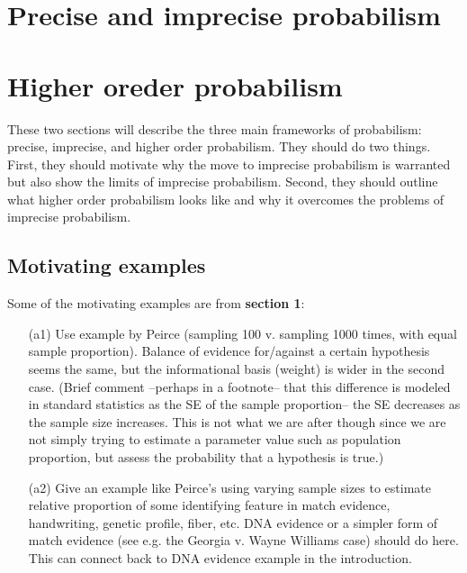 \documentclass[
  10pt,
  dvipsnames,enabledeprecatedfontcommands]{scrartcl}
\begin{document}
\hypertarget{precise-and-imprecise-probabilism}{%
\section{Precise and imprecise
probabilism}\label{precise-and-imprecise-probabilism}}

\hypertarget{higher-oreder-probabilism}{%
\section{Higher oreder probabilism}\label{higher-oreder-probabilism}}

These two sections will describe the three main frameworks of
probabilism: precise, imprecise, and higher order probabilism. They
should do two things. First, they should motivate why the move to
imprecise probabilism is warranted but also show the limits of imprecise
probabilism. Second, they should outline what higher order probabilism
looks like and why it overcomes the problems of imprecise probabilism.

\hypertarget{motivating-examples}{%
\subsection{Motivating examples}\label{motivating-examples}}

Some of the motivating examples are from \textbf{section 1}:

\begin{itemize}

\item[(a1)] Use example by Peirce (sampling 100 v. sampling 1000 times, with equal sample proportion). Balance of evidence for/against a certain hypothesis seems the same, but the informational basis (weight) is wider in the second case.
(Brief comment --perhaps in a footnote-- that this difference is modeled in standard statistics as the SE of the sample proportion-- the SE decreases as the sample size increases. This is not what we are after though since we are not simply trying to estimate a parameter value such as population proportion, but assess the probability that a hypothesis is true.) 

\item[(a2)] Give an example like Peirce's using varying sample sizes to estimate relative proportion of some identifying feature in match evidence, handwriting, genetic profile, fiber, etc. DNA evidence or a simpler form of match evidence (see e.g. the Georgia v. Wayne Williams case) should do here. This can connect back to DNA evidence example in the introduction.

\end{itemize}
\end{document}
